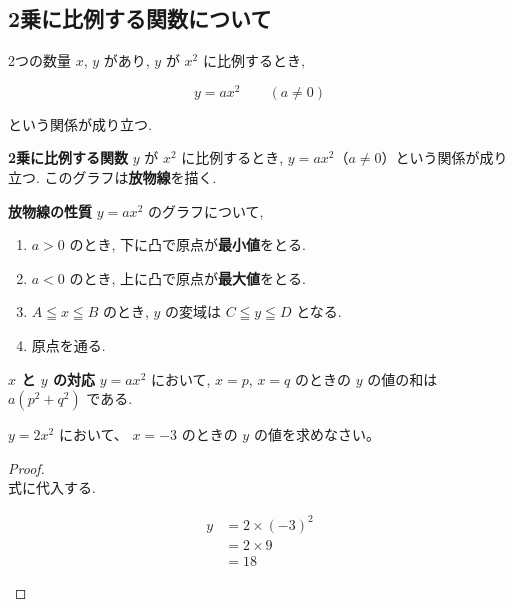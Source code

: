 \subsection{2乗に比例する関数について}

2つの数量 $x$, $y$ があり, $y$ が $x^2$ に比例するとき,

\[y = ax^2 \qquad (a \neq 0)\]

という関係が成り立つ.

\begin{definitionbox}{\textbf{2乗に比例する関数}}
    $y$ が $x^2$ に比例するとき, $y = ax^2$（$a \neq 0$）という関係が成り立つ.
    このグラフは\textbf{放物線}を描く.
\end{definitionbox}

\begin{theorembox}{\textbf{放物線の性質}}
    $y = ax^2$ のグラフについて,
    \begin{enumerate}
        \item $a > 0$ のとき, 下に凸で原点が\textbf{最小値}をとる.
        \item $a < 0$ のとき, 上に凸で原点が\textbf{最大値}をとる.
        \item $A \leqq x \leqq B$ のとき, $y$ の変域は $C \leqq y \leqq D$ となる.
        \item 原点を通る.
    \end{enumerate}
\end{theorembox}

\begin{theorembox}{\textbf{$x$ と $y$ の対応}}
    $y = ax^2$ において, $x = p$, $x = q$ のときの $y$ の値の和は $a(p^2 + q^2)$ である.
\end{theorembox}

\begin{example}
    $y = 2x^2$ において、 $x = -3$ のときの $y$ の値を求めなさい。
\end{example}

\begin{proof}\mbox{}\\
    式に代入する.

    \begin{hiddenanswer}
        \begin{align*}
            y &= 2 \times (-3)^2 \\
              &= 2 \times 9 \\
              &= 18
        \end{align*}
    \end{hiddenanswer}
\end{proof}

\newpage
